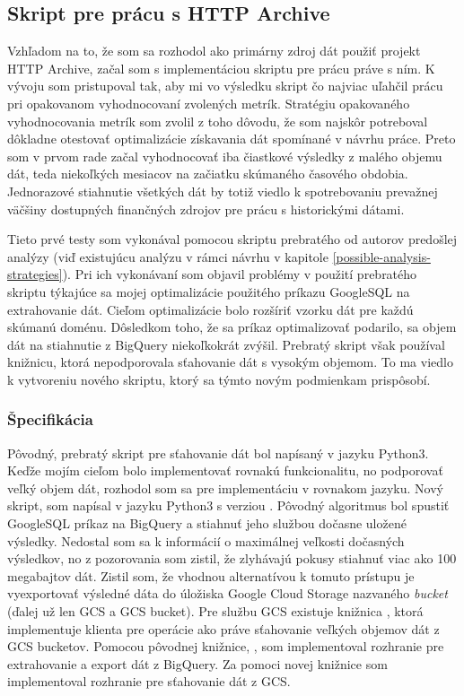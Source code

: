 \subsection{Skript pre prácu s HTTP Archive}

Vzhľadom na to, že som sa rozhodol ako primárny zdroj dát použiť projekt HTTP Archive, začal som s implementáciou skriptu pre prácu práve s ním.
K vývoju som pristupoval tak, aby mi vo výsledku skript čo najviac uľahčil prácu pri opakovanom vyhodnocovaní zvolených metrík.
Stratégiu opakovaného vyhodnocovania metrík som zvolil z toho dôvodu, že som najskôr potreboval dôkladne otestovať optimalizácie získavania dát spomínané v návrhu práce.
Preto som v prvom rade začal vyhodnocovať iba čiastkové výsledky z malého objemu dát, teda niekoľkých mesiacov na začiatku skúmaného časového obdobia.
Jednorazové stiahnutie všetkých dát by totiž viedlo k spotrebovaniu prevažnej väčšiny dostupných finančných zdrojov pre prácu s historickými dátami.

Tieto prvé testy som vykonával pomocou skriptu prebratého od autorov predošlej analýzy (viď existujúcu analýzu v rámci návrhu v kapitole \ref{possible-analysis-strategies}).
Pri ich vykonávaní som objavil problémy v použití prebratého skriptu týkajúce sa mojej optimalizácie použitého príkazu GoogleSQL na extrahovanie dát.
Cieľom optimalizácie bolo rozšíriť vzorku dát pre každú skúmanú doménu.
Dôsledkom toho, že sa príkaz optimalizovať podarilo, sa objem dát na stiahnutie z BigQuery niekoľkokrát zvýšil.
Prebratý skript však používal knižnicu, ktorá nepodporovala sťahovanie dát s vysokým objemom.
To ma viedlo k vytvoreniu nového skriptu, ktorý sa týmto novým podmienkam prispôsobí.

\subsubsection{Špecifikácia}

Pôvodný, prebratý skript pre sťahovanie dát bol napísaný v jazyku Python3.
Keďže mojím cieľom bolo implementovať rovnakú funkcionalitu, no podporovať veľký objem dát, rozhodol som sa pre implementáciu v rovnakom jazyku.
Nový skript,  som napísal v jazyku Python3 s verziou .
Pôvodný algoritmus bol spustiť GoogleSQL príkaz na BigQuery a stiahnuť jeho službou dočasne uložené výsledky.
Nedostal som sa k informácií o maximálnej veľkosti dočasných výsledkov, no z pozorovania som zistil, že zlyhávajú pokusy stiahnuť viac ako 100 megabajtov dát.
Zistil som, že vhodnou alternatívou k tomuto prístupu je vyexportovať výsledné dáta do úložiska Google Cloud Storage nazvaného \textit{bucket} (ďalej už len GCS a GCS bucket).
Pre službu GCS existuje knižnica , ktorá implementuje klienta pre operácie ako práve sťahovanie veľkých objemov dát z GCS bucketov.
Pomocou pôvodnej knižnice, , som implementoval rozhranie pre extrahovanie a export dát z BigQuery.
Za pomoci novej knižnice som implementoval rozhranie pre sťahovanie dát z GCS.

